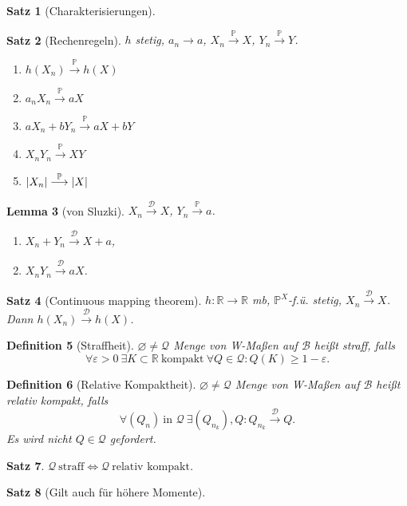 \documentclass[a4paper,8pt]{article}
\newcounter{Sec}
\theoremstyle{nonumberbreak}
\newtheorem{definition}{Definition}[Sec]
\newtheorem{satz}[definition]{Satz}
\newtheorem{lemma}[definition]{Lemma}
\renewcommand{\P}{\mathbb{P}}
\newcommand{\R}{\mathbb{R}}
\newcommand{\sk}{\mathrel{\stackrel{\P}{\longrightarrow}}}
\newcommand{\vk}{\mathrel{\stackrel{\mathcal{D}}{\longrightarrow}}}
\begin{document}
\begin{multicols}{3}
\begin{satz}[Charakterisierungen]
\begin{enumerate}[label=(\alph*)]
		\end{enumerate}
	\end{satz}
	\begin{satz}[Rechenregeln]
		$h$ stetig, $a_n\to a$, $X_n\sk X$, $Y_n\sk Y$.
		{\setlength{\columnseprule}{0pt}\begin{multicols}{2}
		\begin{enumerate}[label=(\alph*)]
			\item $h(X_n)\sk h(X)$
			\item $a_nX_n\sk aX$
			\item $aX_n+bY_n\sk aX+bY$
			\item $X_nY_n\sk XY$
			\item $\abs{X_n}\sk\abs{X}$
		\end{enumerate}
		\end{multicols}}
	\end{satz}
	\begin{lemma}[von Sluzki]
		$X_n\vk X$, $Y_n\sk a$.
		{\setlength{\columnseprule}{0pt}\begin{multicols}{2}
		\begin{enumerate}[label=(\alph*)]
			\item $X_n+Y_n\vk X+a$,
			\item $X_nY_n\vk aX$.
		\end{enumerate}
		\end{multicols}}
	\end{lemma}
	\begin{satz}[Continuous mapping theorem]
		$h\colon\R\to\R$ mb, $\P^X$-f.ü. stetig, $X_n\vk X$. Dann $h(X_n)\vk h(X)$.
	\end{satz}
	\begin{definition}[Straffheit]
		$\varnothing\neq\mathcal{Q}$ Menge von W-Maßen auf $\mathcal{B}$ heißt straff, falls
		\[\forall\varepsilon>0~\exists K\subset\R~\text{kompakt}~\forall Q\in\mathcal{Q}:Q(K)\geq 1-\varepsilon.\]
	\end{definition}
	\begin{definition}[Relative Kompaktheit]
		$\varnothing\neq\mathcal{Q}$ Menge von W-Maßen auf $\mathcal{B}$ heißt relativ kompakt, falls
		\[\forall (Q_n)~\text{in $\mathcal{Q}$}~\exists (Q_{n_k}), Q: Q_{n_k}\vk Q.\]
		Es wird \textit{nicht} $Q\in\mathcal{Q}$ gefordert.
	\end{definition}
	\begin{satz}
		$\mathcal{Q}~\text{straff}\iff\mathcal{Q}~\text{relativ kompakt}$.
	\end{satz}
	\begin{satz}[Gilt auch für höhere Momente]

\end{satz}
\end{multicols}
\end{document}
